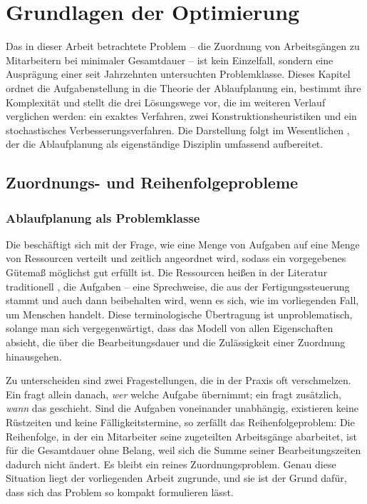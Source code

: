 \chapter{Grundlagen der Optimierung}
\label{kap:grundlagen}

Das in dieser Arbeit betrachtete Problem -- die Zuordnung von Arbeitsgängen zu
Mitarbeitern bei minimaler Gesamtdauer -- ist kein Einzelfall, sondern eine
Ausprägung einer seit Jahrzehnten untersuchten Problemklasse. Dieses Kapitel
ordnet die Aufgabenstellung in die Theorie der Ablaufplanung ein, bestimmt ihre
Komplexität und stellt die drei Lösungswege vor, die im weiteren Verlauf
verglichen werden: ein exaktes Verfahren, zwei Konstruktionsheuristiken und ein
stochastisches Verbesserungsverfahren. Die Darstellung folgt im Wesentlichen
\textcite{pinedo2016scheduling}, der die Ablaufplanung als eigenständige
Disziplin umfassend aufbereitet.

\section{Zuordnungs- und Reihenfolgeprobleme}
\label{sec:einordnung}

\subsection{Ablaufplanung als Problemklasse}

Die  beschäftigt sich mit der Frage, wie eine Menge von
Aufgaben auf eine Menge von Ressourcen verteilt und zeitlich angeordnet wird,
sodass ein vorgegebenes Gütemaß möglichst gut erfüllt ist. Die Ressourcen
heißen in der Literatur traditionell , die Aufgaben
 -- eine Sprechweise, die aus der Fertigungssteuerung stammt und
auch dann beibehalten wird, wenn es sich, wie im vorliegenden Fall, um Menschen
handelt. Diese terminologische Übertragung ist unproblematisch, solange man sich
vergegenwärtigt, dass das Modell von allen Eigenschaften absieht, die über die
Bearbeitungsdauer und die Zulässigkeit einer Zuordnung hinausgehen.

Zu unterscheiden sind zwei Fragestellungen, die in der Praxis oft verschmelzen.
Ein  fragt allein danach, \emph{wer} welche Aufgabe
übernimmt; ein  fragt zusätzlich, \emph{wann} das
geschieht. Sind die Aufgaben voneinander unabhängig, existieren keine
Rüstzeiten und keine Fälligkeitstermine, so zerfällt das Reihenfolgeproblem: Die
Reihenfolge, in der ein Mitarbeiter seine zugeteilten Arbeitsgänge abarbeitet,
ist für die Gesamtdauer ohne Belang, weil sich die Summe seiner
Bearbeitungszeiten dadurch nicht ändert. Es bleibt ein reines
Zuordnungsproblem. Genau diese Situation liegt der vorliegenden Arbeit zugrunde,
und sie ist der Grund dafür, dass sich das Problem so kompakt formulieren lässt.


